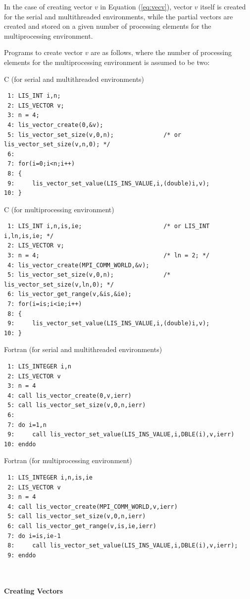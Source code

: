 \documentclass[a4paper]{article}
\begin{document}
In the case of creating vector $v$ in Equation (\ref{eq:vecv}), 
vector $v$ itself is created for the serial and multithreaded environments, while 
the partial vectors are created and stored on a given number of processing elements
for the multiprocessing environment.
 
Programs to create vector $v$ are as follows, 
where the number of processing elements for the multiprocessing environment is assumed to be two:
\begin{itemsquarebox}[l]{C (for serial and multithreaded environments)}
\small
\begin{verbatim}
 1: LIS_INT i,n;
 2: LIS_VECTOR v;
 3: n = 4;
 4: lis_vector_create(0,&v);
 5: lis_vector_set_size(v,0,n);              /* or lis_vector_set_size(v,n,0); */ 
 6:
 7: for(i=0;i<n;i++)
 8: {
 9:     lis_vector_set_value(LIS_INS_VALUE,i,(double)i,v);
10: }
\end{verbatim}
\end{itemsquarebox}
\begin{itemsquarebox}[l]{C (for multiprocessing environment)}
\small
\begin{verbatim}
 1: LIS_INT i,n,is,ie;                       /* or LIS_INT  i,ln,is,ie; */
 2: LIS_VECTOR v;
 3: n = 4;                                   /* ln = 2; */
 4: lis_vector_create(MPI_COMM_WORLD,&v);
 5: lis_vector_set_size(v,0,n);              /* lis_vector_set_size(v,ln,0); */
 6: lis_vector_get_range(v,&is,&ie);
 7: for(i=is;i<ie;i++)
 8: {
 9:     lis_vector_set_value(LIS_INS_VALUE,i,(double)i,v);
10: }
\end{verbatim}
\end{itemsquarebox}
\begin{itemsquarebox}[l]{Fortran (for serial and multithreaded environments)}
\small
\begin{verbatim}
 1: LIS_INTEGER i,n
 2: LIS_VECTOR v
 3: n = 4
 4: call lis_vector_create(0,v,ierr)
 5: call lis_vector_set_size(v,0,n,ierr)  
 6:
 7: do i=1,n
 9:     call lis_vector_set_value(LIS_INS_VALUE,i,DBLE(i),v,ierr)
10: enddo
\end{verbatim}
\end{itemsquarebox}
\begin{itemsquarebox}[l]{Fortran (for multiprocessing environment)}
\small
\begin{verbatim}
 1: LIS_INTEGER i,n,is,ie                 
 2: LIS_VECTOR v
 3: n = 4                                   
 4: call lis_vector_create(MPI_COMM_WORLD,v,ierr)
 5: call lis_vector_set_size(v,0,n,ierr)              
 6: call lis_vector_get_range(v,is,ie,ierr)
 7: do i=is,ie-1
 8:     call lis_vector_set_value(LIS_INS_VALUE,i,DBLE(i),v,ierr);
 9: enddo
\end{verbatim}
\end{itemsquarebox}
\\ \\
\noindent
{\bf Creating Vectors}
\end{document}
